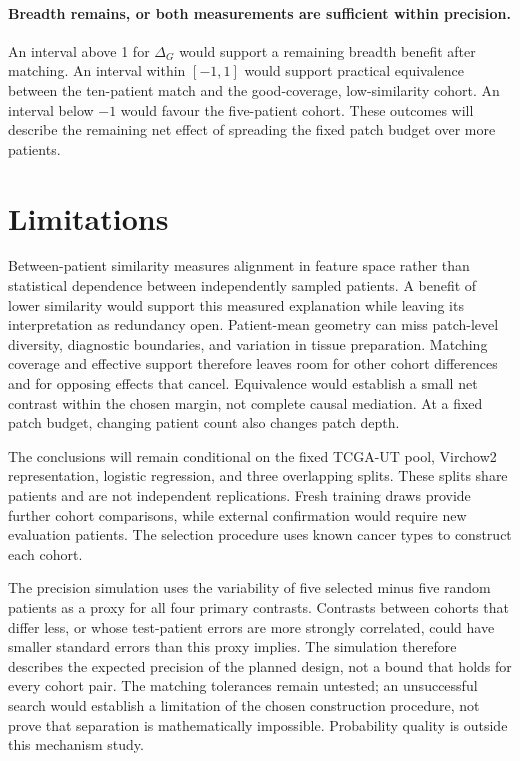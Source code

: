 \documentclass[11pt]{article}
\begin{document}
\paragraph{Breadth remains, or both measurements are sufficient within precision.}
An interval above 1 for $\Delta_G$ would support a remaining breadth benefit after matching. An interval within $[-1,1]$ would support practical equivalence between the ten-patient match and the good-coverage, low-similarity cohort. An interval below $-1$ would favour the five-patient cohort. These outcomes will describe the remaining net effect of spreading the fixed patch budget over more patients.



\section{Limitations}
\label{sec:limitations}
Between-patient similarity measures alignment in feature space rather than statistical dependence between independently sampled patients. A benefit of lower similarity would support this measured explanation while leaving its interpretation as redundancy open. Patient-mean geometry can miss patch-level diversity, diagnostic boundaries, and variation in tissue preparation. Matching coverage and effective support therefore leaves room for other cohort differences and for opposing effects that cancel. Equivalence would establish a small net contrast within the chosen margin, not complete causal mediation. At a fixed patch budget, changing patient count also changes patch depth.

The conclusions will remain conditional on the fixed TCGA-UT pool, Virchow2 representation, logistic regression, and three overlapping splits. These splits share patients and are not independent replications. Fresh training draws provide further cohort comparisons, while external confirmation would require new evaluation patients. The selection procedure uses known cancer types to construct each cohort.

The precision simulation uses the variability of five selected minus five random patients as a proxy for all four primary contrasts. Contrasts between cohorts that differ less, or whose test-patient errors are more strongly correlated, could have smaller standard errors than this proxy implies. The simulation therefore describes the expected precision of the planned design, not a bound that holds for every cohort pair. The matching tolerances remain untested; an unsuccessful search would establish a limitation of the chosen construction procedure, not prove that separation is mathematically impossible. Probability quality is outside this mechanism study.
\end{document}
